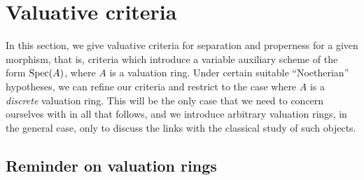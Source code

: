 \section{Valuative criteria}
\label{section:II.7}

In this section, we give valuative criteria for separation and properness for a given morphism, that is, criteria which introduce a variable auxiliary scheme of the form $\operatorname{Spec}(A)$, where $A$ is a valuation ring.
Under certain suitable ``Noetherian'' hypotheses, we can refine our criteria and restrict to the case where $A$ is a \emph{discrete} valuation ring.
This will be the only case that we need to concern ourselves with in all that follows, and we introduce arbitrary valuation rings, in the general case, only to discuss the links with the classical study of such objects.


\subsection{Reminder on valuation rings}
\label{subsection:II.7.1}






